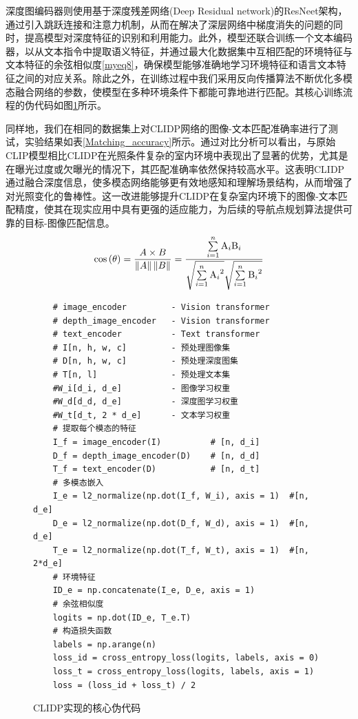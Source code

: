 深度图编码器则使用基于深度残差网络(Deep Residual network)的ResNeet架构，通过引入跳跃连接和注意力机制，从而在解决了深层网络中梯度消失的问题的同时，提高模型对深度特征的识别和利用能力。此外，模型还联合训练一个文本编码器，以从文本指令中提取语义特征，并通过最大化数据集中互相匹配的环境特征与文本特征的余弦相似度\eqref{myeq8}，确保模型能够准确地学习环境特征和语言文本特征之间的对应关系。除此之外，在训练过程中我们采用反向传播算法不断优化多模态融合网络的参数，使模型在多种环境条件下都能可靠地进行匹配。其核心训练流程的伪代码如图\ref{CLIDP_CODE}所示。


同样地，我们在相同的数据集上对CLIDP网络的图像-文本匹配准确率进行了测试，实验结果如表\ref{Matching_accuracy}所示。通过对比分析可以看出，与原始CLIP模型相比CLIDP在光照条件复杂的室内环境中表现出了显著的优势，尤其是在曝光过度或欠曝光的情况下，其匹配准确率依然保持较高水平。这表明CLIDP通过融合深度信息，使多模态网络能够更有效地感知和理解场景结构，从而增强了对光照变化的鲁棒性。这一改进能够提升CLIDP在复杂室内环境下的图像-文本匹配精度，使其在现实应用中具有更强的适应能力，为后续的导航点规划算法提供可靠的目标-图像匹配信息。
\begin{equation}
    \cos \left( \theta  \right) = \frac{{A \times B}}{{\left\| A \right\|\left\| B \right\|}} = \frac{{\sum\limits_{i = 1}^n {{{\rm A}_i}{{\rm B}_i}} }}{{\sqrt {\sum\limits_{i = 1}^n {{{\rm A}_i}^2} } \sqrt {\sum\limits_{i = 1}^n {{{\rm B}_i}^2} } }}
        \label{myeq8}
    \end{equation}

\begin{figure}[H]
    \begin{lstlisting} 
    # image_encoder	        - Vision transformer
    # depth_image_encoder	- Vision transformer
    # text_encoder	        - Text transformer
    # I[n, h, w, c]	        - 预处理图像集
    # D[n, h, w, c]	        - 预处理深度图集
    # T[n, l]	            - 预处理文本集
    #W_i[d_i, d_e]	        - 图像学习权重
    #W_d[d_d, d_e]	        - 深度图学习权重
    #W_t[d_t, 2 * d_e]	    - 文本学习权重
    # 提取每个模态的特征
    I_f = image_encoder(I)	        # [n, d_i]
    D_f = depth_image_encoder(D)	# [n, d_d]
    T_f = text_encoder(D)	        # [n, d_t]
    # 多模态嵌入
    I_e = l2_normalize(np.dot(I_f, W_i), axis = 1)	#[n, d_e]
    D_e = l2_normalize(np.dot(D_f, W_d), axis = 1)	#[n, d_e]
    T_e = l2_normalize(np.dot(T_f, W_t), axis = 1)	#[n, 2*d_e]
    # 环境特征
    ID_e = np.concatenate(I_e, D_e, axis = 1)
    # 余弦相似度
    logits = np.dot(ID_e, T_e.T)
    # 构造损失函数
    labels = np.arange(n)
    loss_id = cross_entropy_loss(logits, labels, axis = 0)
    loss_t = cross_entropy_loss(logits, labels, axis = 1)
    loss = (loss_id + loss_t) / 2
    \end{lstlisting}
    \caption{CLIDP实现的核心伪代码}
    \label{CLIDP_CODE}
    \end{figure}
    




